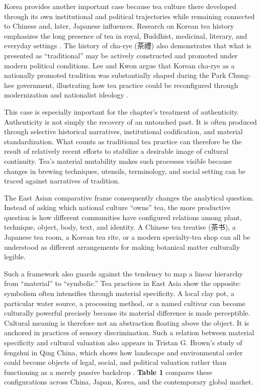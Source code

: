 \documentclass[numbers]{IntechOpen-Book}
\newcommand{\zh}[1]{{\CJKfontspec{Noto Serif CJK SC}\upshape #1}}
\begin{document}
Korea provides another important case because tea culture there developed through its own institutional and political trajectories while remaining connected to Chinese and, later, Japanese influences. Research on Korean tea history emphasizes the long presence of tea in royal, Buddhist, medicinal, literary, and everyday settings \cite{leekwon}. The history of cha-rye (\zh{茶禮}) also demonstrates that what is presented as ``traditional'' may be actively constructed and promoted under modern political conditions. Lee and Kwon argue that Korean cha-rye as a nationally promoted tradition was substantially shaped during the Park Chung-hee government, illustrating how tea practice could be reconfigured through modernization and nationalist ideology \cite{leekwon}.

This case is especially important for the chapter's treatment of authenticity. Authenticity is not simply the recovery of an untouched past. It is often produced through selective historical narratives, institutional codification, and material standardization. What counts as traditional tea practice can therefore be the result of relatively recent efforts to stabilize a desirable image of cultural continuity. Tea's material mutability makes such processes visible because changes in brewing techniques, utensils, terminology, and social setting can be traced against narratives of tradition.

The East Asian comparative frame consequently changes the analytical question. Instead of asking which national culture ``owns'' tea, the more productive question is how different communities have configured relations among plant, technique, object, body, text, and identity. A Chinese tea treatise (\zh{茶书}), a Japanese tea room, a Korean tea rite, or a modern specialty-tea shop can all be understood as different arrangements for making botanical matter culturally legible.

Such a framework also guards against the tendency to map a linear hierarchy from ``material'' to ``symbolic.'' Tea practices in East Asia show the opposite: symbolism often intensifies through material specificity. A local clay pot, a particular water source, a processing method, or a named cultivar can become culturally powerful precisely because its material difference is made perceptible. Cultural meaning is therefore not an abstraction floating above the object. It is anchored in practices of sensory discrimination. Such a relation between material specificity and cultural valuation also appears in Tristan G. Brown's study of fengshui in Qing China, which shows how landscape and environmental order could become objects of legal, social, and political valuation rather than functioning as a merely passive backdrop \cite{brown}. \textbf{Table 1} compares these configurations across China, Japan, Korea, and the contemporary global market.
\end{document}
